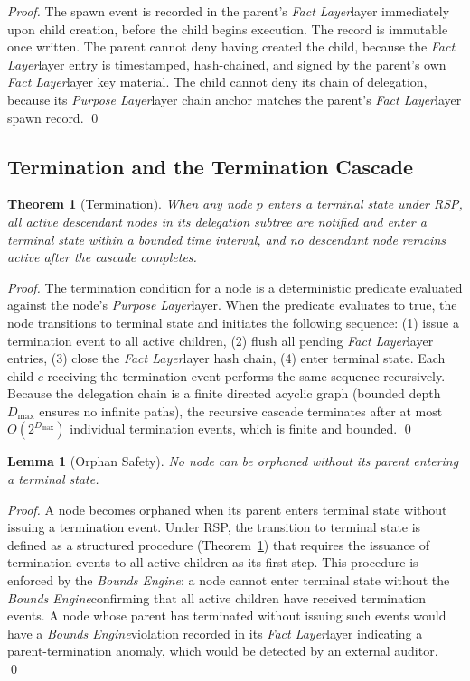 \documentclass[12pt]{article}
\newtheorem{thrm}[section]{Theorem}
\newtheorem{lemm}[section]{Lemma}
\def\purpose{\textit{Purpose Layer}}
\def\bounds{\textit{Bounds Engine}}
\def\fact{\textit{Fact Layer}}
\begin{document}
\begin{proof}
The spawn event is recorded in the parent's \fact layer immediately upon child creation, before the child begins execution. The record is immutable once written. The parent cannot deny having created the child, because the \fact layer entry is timestamped, hash-chained, and signed by the parent's own \fact layer key material. The child cannot deny its chain of delegation, because its \purpose layer chain anchor matches the parent's \fact layer spawn record. \qed
\end{proof}

\subsection{Termination and the Termination Cascade}

\begin{thrm}[Termination]
\label{thrm:termination}
When any node $p$ enters a terminal state under RSP, all active descendant nodes in its delegation subtree are notified and enter a terminal state within a bounded time interval, and no descendant node remains active after the cascade completes.
\end{thrm}

\begin{proof}
The termination condition for a node is a deterministic predicate evaluated against the node's \purpose layer. When the predicate evaluates to true, the node transitions to terminal state and initiates the following sequence: (1) issue a termination event to all active children, (2) flush all pending \fact layer entries, (3) close the \fact layer hash chain, (4) enter terminal state. Each child $c$ receiving the termination event performs the same sequence recursively. Because the delegation chain is a finite directed acyclic graph (bounded depth $D_{\max}$ ensures no infinite paths), the recursive cascade terminates after at most $O(2^{D_{\max}})$ individual termination events, which is finite and bounded. \qed
\end{proof}

\begin{lemm}[Orphan Safety]
\label{lemm:orphan-safety}
No node can be orphaned without its parent entering a terminal state.
\end{lemm}

\begin{proof}
A node becomes orphaned when its parent enters terminal state without issuing a termination event. Under RSP, the transition to terminal state is defined as a structured procedure (Theorem~\ref{thrm:termination}) that requires the issuance of termination events to all active children as its first step. This procedure is enforced by the \bounds: a node cannot enter terminal state without the \bounds confirming that all active children have received termination events. A node whose parent has terminated without issuing such events would have a \bounds violation recorded in its \fact layer indicating a parent-termination anomaly, which would be detected by an external auditor. \qed
\end{proof}
\end{document}
